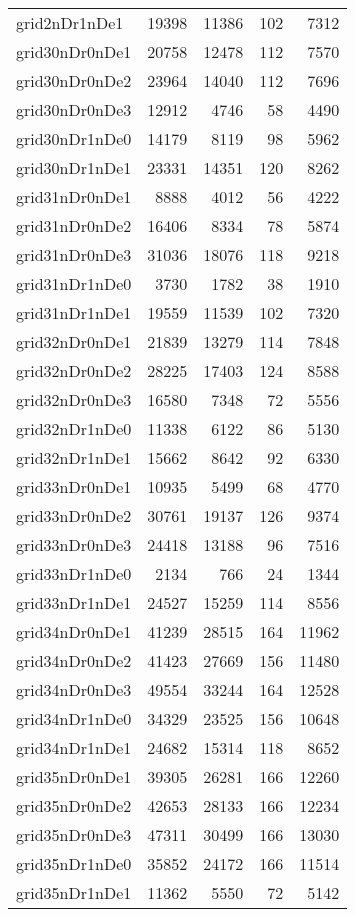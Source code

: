 \begin{longtable}{lrrrr}
grid2nDr1nDe1 & 19398 & 11386 & 102 & 7312 \\
grid30nDr0nDe1 & 20758 & 12478 & 112 & 7570 \\
grid30nDr0nDe2 & 23964 & 14040 & 112 & 7696 \\
grid30nDr0nDe3 & 12912 & 4746 & 58 & 4490 \\
grid30nDr1nDe0 & 14179 & 8119 & 98 & 5962 \\
grid30nDr1nDe1 & 23331 & 14351 & 120 & 8262 \\
grid31nDr0nDe1 & 8888 & 4012 & 56 & 4222 \\
grid31nDr0nDe2 & 16406 & 8334 & 78 & 5874 \\
grid31nDr0nDe3 & 31036 & 18076 & 118 & 9218 \\
grid31nDr1nDe0 & 3730 & 1782 & 38 & 1910 \\
grid31nDr1nDe1 & 19559 & 11539 & 102 & 7320 \\
grid32nDr0nDe1 & 21839 & 13279 & 114 & 7848 \\
grid32nDr0nDe2 & 28225 & 17403 & 124 & 8588 \\
grid32nDr0nDe3 & 16580 & 7348 & 72 & 5556 \\
grid32nDr1nDe0 & 11338 & 6122 & 86 & 5130 \\
grid32nDr1nDe1 & 15662 & 8642 & 92 & 6330 \\
grid33nDr0nDe1 & 10935 & 5499 & 68 & 4770 \\
grid33nDr0nDe2 & 30761 & 19137 & 126 & 9374 \\
grid33nDr0nDe3 & 24418 & 13188 & 96 & 7516 \\
grid33nDr1nDe0 & 2134 & 766 & 24 & 1344 \\
grid33nDr1nDe1 & 24527 & 15259 & 114 & 8556 \\
grid34nDr0nDe1 & 41239 & 28515 & 164 & 11962 \\
grid34nDr0nDe2 & 41423 & 27669 & 156 & 11480 \\
grid34nDr0nDe3 & 49554 & 33244 & 164 & 12528 \\
grid34nDr1nDe0 & 34329 & 23525 & 156 & 10648 \\
grid34nDr1nDe1 & 24682 & 15314 & 118 & 8652 \\
grid35nDr0nDe1 & 39305 & 26281 & 166 & 12260 \\
grid35nDr0nDe2 & 42653 & 28133 & 166 & 12234 \\
grid35nDr0nDe3 & 47311 & 30499 & 166 & 13030 \\
grid35nDr1nDe0 & 35852 & 24172 & 166 & 11514 \\
grid35nDr1nDe1 & 11362 & 5550 & 72 & 5142 \\

\end{longtable}
